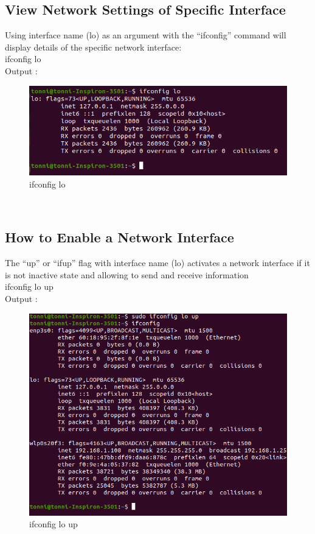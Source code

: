 \documentclass[11pt]{article}
\begin{document}
\subsection{ View Network Settings of Specific Interface}
Using interface name (lo) as an argument with the “ifconfig” command will display details of the specific network interface:\\[6pt]
  ifconfig lo \\[12pt]   
        Output : 
  \begin{figure}[!h]
\centering
\includegraphics[width=\textwidth]{lo_ifconfig.png}
\caption{ifconfig lo}
\end{figure}
\\[72pt]
\subsection{ How to Enable a Network Interface}
The “up” or “ifup” flag with interface name (lo) activates a network interface if it is not inactive state and allowing to send and receive information\\[6pt]
  ifconfig lo up\\[12pt]   
        Output : 
  \begin{figure}[!h]
\centering
\includegraphics[width=\textwidth]{ifconfig_up.png}
\caption{ifconfig lo up}
\end{figure}
\end{document}
